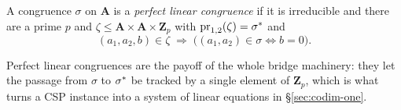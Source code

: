 \begin{definition}\label{def:perfect-linear}
A congruence $\sigma$ on $\mathbf A$ is a \emph{perfect linear congruence} if
it is irreducible and there are a prime $p$ and
$\zeta\le\mathbf A\times\mathbf A\times\mathbf Z_{p}$ with
$\operatorname*{pr}_{1,2}(\zeta)=\sigma^{*}$ and
\[
  (a_{1},a_{2},b)\in\zeta\;\Longrightarrow\;
  \bigl((a_{1},a_{2})\in\sigma\iff b=0\bigr).
\]
\end{definition}

Perfect linear congruences are the payoff of the whole bridge machinery: they
let the passage from $\sigma$ to $\sigma^{*}$ be tracked by a single
element of $\mathbf Z_{p}$, which is what turns a CSP instance into a system of
linear equations in \S\ref{sec:codim-one}.
